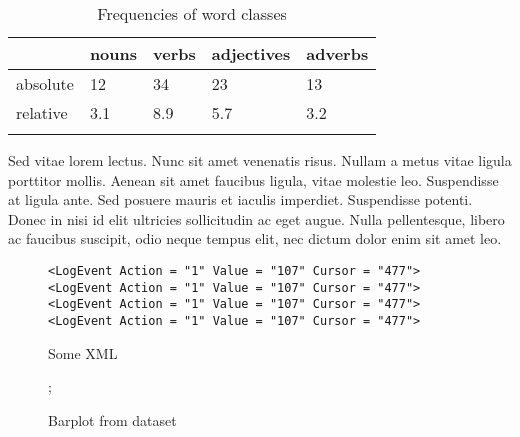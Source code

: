 \begin{table}
\caption{Frequencies of word classes}
\label{tab:1:frequencies}
 \begin{tabular}{lllll} %
  \lsptoprule
            & nouns & verbs & adjectives & adverbs\\ %
  \midrule
  absolute  &   12 &    34  &    23     & 13\\
  relative  &   3.1 &   8.9 &    5.7    & 3.2\\
  \lspbottomrule
 \end{tabular}
\end{table}


Sed vitae lorem lectus. Nunc sit amet venenatis risus. Nullam a metus vitae ligula porttitor mollis. Aenean sit amet faucibus ligula, vitae molestie leo. Suspendisse at ligula ante. Sed posuere mauris et iaculis imperdiet. Suspendisse potenti. Donec in nisi id elit ultricies sollicitudin ac eget augue. Nulla pellentesque, libero ac faucibus suscipit, odio neque tempus elit, nec dictum dolor enim sit amet leo. 

\begin{figure}
\caption{Some XML}
\begin{lstlisting}
<LogEvent Action = "1" Value = "107" Cursor = "477">
<LogEvent Action = "1" Value = "107" Cursor = "477">
<LogEvent Action = "1" Value = "107" Cursor = "477">
<LogEvent Action = "1" Value = "107" Cursor = "477">
\end{lstlisting}
\end{figure}

\begin{figure} 
\mydata;
\caption{Barplot from dataset}
\end{figure}

 

